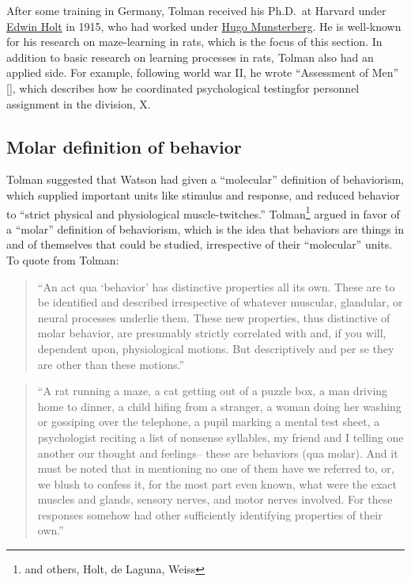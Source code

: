 \documentclass[
  oneside,
  12pt]{crumpbook}
\begin{document}
After some training in Germany, Tolman received his Ph.D.~at Harvard under \href{https://en.wikipedia.org/wiki/Edwin_Holt}{Edwin Holt} in 1915, who had worked under \href{https://en.wikipedia.org/wiki/Hugo_Münsterberg}{Hugo Munsterberg}. He is well-known for his research on maze-learning in rats, which is the focus of this section. In addition to basic research on learning processes in rats, Tolman also had an applied side. For example, following world war II, he wrote ``Assessment of Men'' {[}{]}, which describes how he coordinated psychological testingfor personnel assignment in the division, X.

\hypertarget{molar-definition-of-behavior}{%
\subsection{Molar definition of behavior}\label{molar-definition-of-behavior}}

Tolman suggested that Watson had given a ``molecular'' definition of behaviorism, which supplied important units like stimulus and response, and reduced behavior to ``strict physical and physiological muscle-twitches.'' Tolman\footnote{and others, Holt, de Laguna, Weiss} argued in favor of a ``molar'' definition of behaviorism, which is the idea that behaviors are things in and of themselves that could be studied, irrespective of their ``molecular'' units. To quote from Tolman:

\begin{quote}
``An act qua `behavior' has distinctive properties all its own. These are to be identified and described irrespective of whatever muscular, glandular, or neural processes underlie them. These new properties, thus distinctive of molar behavior, are presumably strictly correlated with and, if you will, dependent upon, physiological motions. But descriptively and per se they are other than these motions.''
\end{quote}

\begin{quote}
``A rat running a maze, a cat getting out of a puzzle box, a man driving home to dinner, a child hifing from a stranger, a woman doing her washing or gossiping over the telephone, a pupil marking a mental test sheet, a psychologist reciting a list of nonsense syllables, my friend and I telling one another our thought and feelings-- these are behaviors (qua molar). And it must be noted that in mentioning no one of them have we referred to, or, we blush to confess it, for the most part even known, what were the exact muscles and glands, sensory nerves, and motor nerves involved. For these responses somehow had other sufficiently identifying properties of their own.''
\end{quote}
\end{document}
